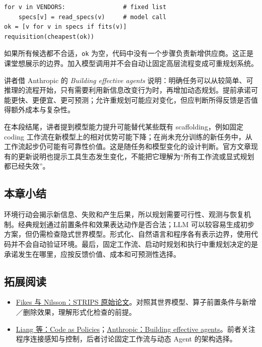\documentclass[11pt,a4paper]{article}
\begin{document}
\par\noindent\begin{minipage}{\textwidth}
\begin{lstlisting}[caption={课程伪代码：固定供应商列表的采购工作流；来源为官方课件第 16 页}]
for v in VENDORS:                # fixed list
    specs[v] = read_specs(v)     # model call
ok = [v for v in specs if fits(v)]
requisition(cheapest(ok))
\end{lstlisting}
\end{minipage}

如果所有候选都不合适，\texttt{ok} 为空，代码中没有一个步骤负责新增供应商。这正是课堂想展示的边界。加入模型调用并不会自动让固定高层流程变成可重规划系统。

讲者借 Anthropic 的 \emph{Building effective agents} 说明：明确任务可以从较简单、可推理的流程开始，只有需要利用新信息改变行为时，再增加动态规划。提前承诺可能更快、更便宜、更可预测；允许重规划可能应对变化，但应判断所得反馈是否值得额外成本与复杂性。

在本段结尾，讲者提到模型能力提升可能替代某些既有 scaffolding，例如固定 coding 工作流在新模型上的相对优势可能下降；在尚未充分训练的新任务中，从工作流起步仍可能有可靠性价值。这是随任务和模型变化的设计判断。官方文章现有的更新说明也提示工具生态发生变化，不能把它理解为“所有工作流或显式规划都已经失效”。

\subsection{本章小结}

环境行动会揭示新信息、失败和产生后果，所以规划需要可行性、观测与恢复机制。经典规划通过前置条件和效果表达动作是否合法；LLM 可以较容易生成初步方案，但仍需检查隐式世界模型。形式化、自然语言和程序各有表示边界，使用代码并不会自动验证环境。最后，固定工作流、启动时规划和执行中重规划决定的是承诺发生在哪里，应按反馈价值、成本和可预测性选择。

\subsection{拓展阅读}

\begin{itemize}
\item \href{https://ai.stanford.edu/~nilsson/OnlinePubs-Nils/PublishedPapers/strips.pdf}{Fikes 与 Nilsson：STRIPS 原始论文}。对照其世界模型、算子前置条件与新增／删除效果，理解形式化检查的前提。
\item \href{https://arxiv.org/abs/2209.07753}{Liang 等：Code as Policies}；\href{https://www.anthropic.com/engineering/building-effective-agents}{Anthropic：Building effective agents}。前者关注程序连接感知与控制，后者讨论固定工作流与动态 Agent 的架构选择。
\end{itemize}
\end{document}
